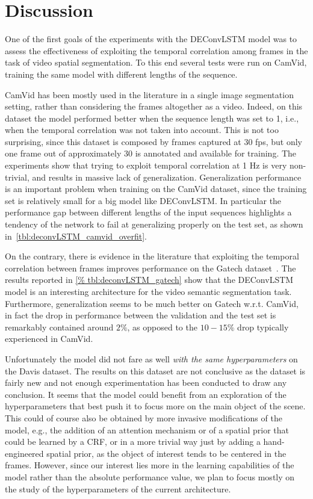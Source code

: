 \section{Discussion}\label{sec:deconvLSTM_discussion}
One of the first goals of the experiments with the DEConvLSTM model was to
assess the effectiveness of exploiting the temporal correlation among frames in
the task of video spatial segmentation. To this end several tests were run on
CamVid, training the same model with different lengths of the sequence.

CamVid has been mostly used in the literature in a single image
segmentation setting, rather than considering the frames altogether as a video.
Indeed, on this dataset the model performed better when the sequence length was
set to 1, i.e., when the temporal correlation was not taken into account.
This is not too surprising, since this dataset is composed by frames captured
at 30 fps, but only one frame out of approximately 30 is annotated and available
for training. The experiments show that trying to exploit temporal correlation
at 1 Hz is very non-trivial, and results in massive lack of generalization.
Generalization performance is an important problem when training on the CamVid
dataset, since the training set is relatively small for a big model like
DEConvLSTM. In particular the performance gap between different lengths of the
input sequences highlights a tendency of the network to fail at generalizing
properly on the test set, as shown in~\autoref{tbl:deconvLSTM_camvid_overfit}.

On the contrary, there is evidence in the literature that exploiting the
temporal correlation between frames improves performance on the Gatech
dataset~\citep{Tran16v2v}. The results reported in \autoref{%
tbl:deconvLSTM_gatech} show that the DEConvLSTM model is an interesting
architecture for the video semantic segmentation task. Furthermore,
generalization seems to be much better on Gatech w.r.t. CamVid, in fact the
drop in performance between the validation and the test set is remarkably
contained around $2\%$, as opposed to the $10-15\%$ drop typically experienced
in CamVid.

Unfortunately the model did not fare as well \emph{with the same
hyperparameters} on the Davis dataset. The results on this dataset are not
conclusive as the dataset is fairly new and not enough experimentation has been
conducted to draw any conclusion. It seems that the model could benefit from an
exploration of the hyperparameters that best push it to focus more on the main
object of the scene. This could of course also be obtained by more invasive
modifications of the model, e.g., the addition of an attention mechanism or of
a spatial prior that could be learned by a CRF, or in a more trivial way just
by adding a hand-engineered spatial prior, as the object of interest tends to
be centered in the frames. However, since our interest lies more in the
learning capabilities of the model rather than the absolute performance value,
we plan to focus mostly on the study of the hyperparameters of the current
architecture.


